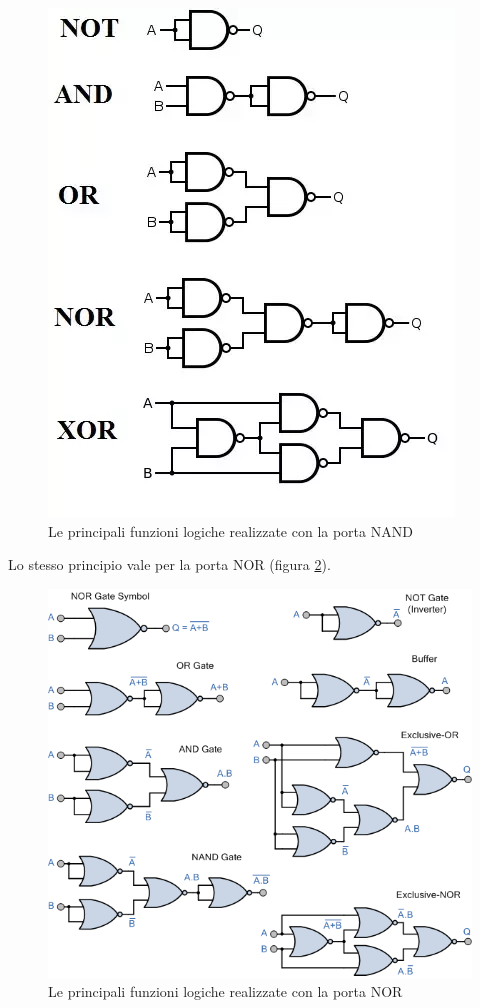\documentclass{article}
\begin{document}
\begin{figure}[h]
  \centering
  \includegraphics[scale=0.7]{IM_NAND_allpowerful}
  \caption{Le principali funzioni logiche realizzate con la porta NAND}
  \label{NAND_allpowerful}
\end{figure}
\clearpage
Lo stesso principio vale per la porta NOR (figura \ref{NOR_allpowerful}).

\begin{figure}[h]
  \centering
  \includegraphics[scale=0.7]{IM_NOR_allpowerful}
  \caption{Le principali funzioni logiche realizzate con la porta NOR}
  \label{NOR_allpowerful}
\end{figure}
\end{document}

